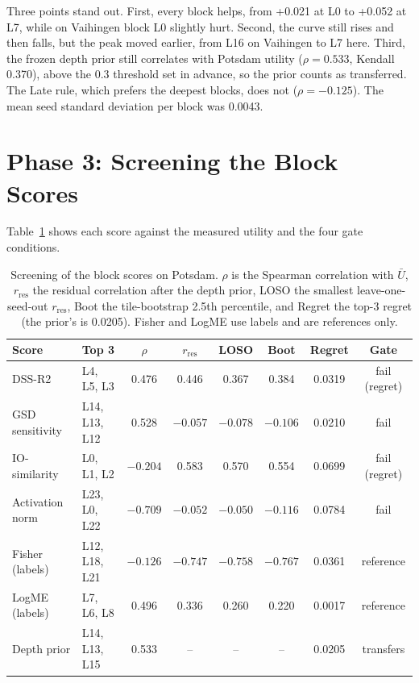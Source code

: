 \documentclass[11pt,a4paper]{report}
\begin{document}
Three points stand out. First, every block helps, from +0.021 at L0 to +0.052 at L7, while on Vaihingen block L0 slightly hurt. Second, the curve still rises and then falls, but the peak moved earlier, from L16 on Vaihingen to L7 here. Third, the frozen depth prior still correlates with Potsdam utility ($\rho = 0.533$, Kendall 0.370), above the 0.3 threshold set in advance, so the prior counts as transferred. The Late rule, which prefers the deepest blocks, does not ($\rho = -0.125$). The mean seed standard deviation per block was 0.0043.

\section{Phase 3: Screening the Block Scores}

Table~\ref{tab:gate} shows each score against the measured utility and the four gate conditions.

\begin{table}[t]
\centering
\caption{Screening of the block scores on Potsdam. $\rho$ is the Spearman correlation with $\bar U$, $r_{\text{res}}$ the residual correlation after the depth prior, LOSO the smallest leave-one-seed-out $r_{\text{res}}$, Boot the tile-bootstrap 2.5th percentile, and Regret the top-3 regret (the prior's is 0.0205). Fisher and LogME use labels and are references only.}
\label{tab:gate}
\small
\begin{tabular}{@{}llcccccc@{}}
\toprule
\textbf{Score} & \textbf{Top 3} & \textbf{$\rho$} & \textbf{$r_{\text{res}}$} & \textbf{LOSO} & \textbf{Boot} & \textbf{Regret} & \textbf{Gate} \\
\midrule
DSS-R2 & L4, L5, L3 & 0.476 & 0.446 & 0.367 & 0.384 & 0.0319 & fail (regret) \\
GSD sensitivity & L14, L13, L12 & 0.528 & $-0.057$ & $-0.078$ & $-0.106$ & 0.0210 & fail \\
IO-similarity & L0, L1, L2 & $-0.204$ & 0.583 & 0.570 & 0.554 & 0.0699 & fail (regret) \\
Activation norm & L23, L0, L22 & $-0.709$ & $-0.052$ & $-0.050$ & $-0.116$ & 0.0784 & fail \\
\midrule
Fisher (labels) & L12, L18, L21 & $-0.126$ & $-0.747$ & $-0.758$ & $-0.767$ & 0.0361 & reference \\
LogME (labels) & L7, L6, L8 & 0.496 & 0.336 & 0.260 & 0.220 & 0.0017 & reference \\
\midrule
Depth prior & L14, L13, L15 & 0.533 & -- & -- & -- & 0.0205 & transfers \\
\bottomrule
\end{tabular}
\end{table}
\end{document}
